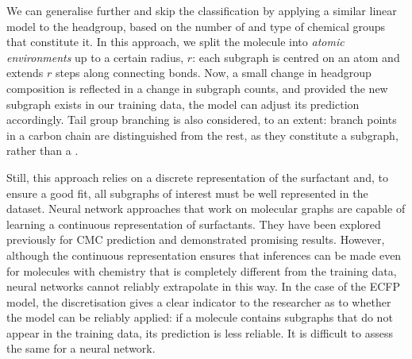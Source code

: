 We can generalise further and skip the classification by applying a similar
linear model to the headgroup, based on the number of and type of chemical
groups that constitute it. In this approach, we split the molecule into
\emph{atomic environments} up to a certain radius, $r$: each subgraph is centred
on an atom and extends $r$ steps along connecting bonds. Now, a small change in
headgroup composition is reflected in a change in subgraph counts, and provided
the new subgraph exists in our training data, the model can adjust its
prediction accordingly. Tail group branching is also considered, to an extent:
branch points in a carbon chain are distinguished from the rest, as they
constitute a  subgraph, rather than a .

Still, this approach relies on a discrete representation of the surfactant and,
to ensure a good fit, all subgraphs of interest must be well represented in the
dataset. Neural network approaches that work on molecular graphs are capable of
learning a continuous representation of surfactants. They have been explored
previously for CMC prediction and demonstrated promising results. However,
although the continuous representation ensures that inferences can be made even
for molecules with chemistry that is completely different from the training
data, neural networks cannot reliably extrapolate in this way. In the case of
the ECFP model, the discretisation gives a clear indicator to the researcher as
to whether the model can be reliably applied: if a molecule contains subgraphs
that do not appear in the training data, its prediction is less reliable. It is
difficult to assess the same for a neural network.